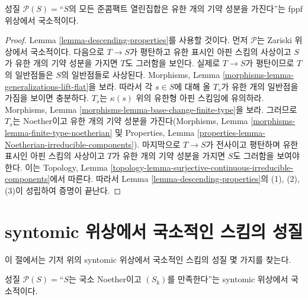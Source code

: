 \begin{lemma}
\label{lemma-locally-finite-nr-irred-local-fppf}
성질 $\mathcal{P}(S) =$``$S$의 모든 준콤팩트 열린집합은 유한 개의 기약
성분을 가진다''는 fppf 위상에서 국소적이다.
\end{lemma}

\begin{proof}
Lemma \ref{lemma-descending-properties}를 사용할 것이다. 먼저
$\mathcal{P}$는 Zariski 위상에서 국소적이다. 다음으로 $T \to S$가 평탄하고
유한 표시인 아핀 스킴의 사상이고 $S$가 유한 개의 기약 성분을 가지면
$T$도 그러함을 보인다. 실제로 $T \to S$가 평탄이므로 $T$의 일반점들은
$S$의 일반점들로 사상된다. Morphisms, Lemma
\ref{morphisms-lemma-generalizations-lift-flat}을 보라. 따라서 각 $s \in S$에
대해 올 $T_s$가 유한 개의 일반점을 가짐을 보이면 충분하다. $T_s$는
$\kappa(s)$ 위의 유한형 아핀 스킴임에 유의하라. Morphisms, Lemma
\ref{morphisms-lemma-base-change-finite-type}을 보라. 그러므로 $T_s$는
Noether이고 유한 개의 기약 성분을 가진다(Morphisms, Lemma
\ref{morphisms-lemma-finite-type-noetherian} 및 Properties, Lemma
\ref{properties-lemma-Noetherian-irreducible-components}). 마지막으로
$T \to S$가 전사이고 평탄하며 유한 표시인 아핀 스킴의 사상이고 $T$가
유한 개의 기약 성분을 가지면 $S$도 그러함을 보여야 한다. 이는 Topology,
Lemma \ref{topology-lemma-surjective-continuous-irreducible-components}에서
따른다. 따라서 Lemma \ref{lemma-descending-properties}의 (1), (2), (3)이
성립하여 증명이 끝난다.
\end{proof}




\section{syntomic 위상에서 국소적인 스킴의 성질}
\label{section-descending-properties-syntomic}

\noindent
이 절에서는 기저 위의 syntomic 위상에서 국소적인 스킴의 성질 몇 가지를
찾는다.

\begin{lemma}
\label{lemma-Sk-local-syntomic}
성질 $\mathcal{P}(S) =$``$S$는 국소 Noether이고 $(S_k)$를 만족한다''는
syntomic 위상에서 국소적이다.
\end{lemma}

